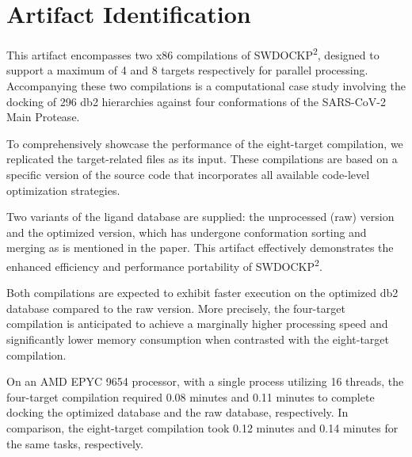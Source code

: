 \documentclass[nonacm,sigconf]{acmart}
\begin{document}
\section{Artifact Identification}


\newartifact

\artrel
This artifact encompasses two x86 compilations of SWDOCKP\textsuperscript{2}, designed to support a maximum of 4 and 8 targets respectively for parallel processing. Accompanying these two compilations is a computational case study involving the docking of 296 db2 hierarchies against four conformations of the SARS-CoV-2 Main Protease.

To comprehensively showcase the performance of the eight-target compilation, we replicated the target-related files as its input. These compilations are based on a specific version of the source code that incorporates all available code-level optimization strategies.

Two variants of the ligand database are supplied: the unprocessed (raw) version and the optimized version, which has undergone conformation sorting and merging as is mentioned in the paper. This artifact effectively demonstrates the enhanced efficiency and performance portability of SWDOCKP\textsuperscript{2}.


\artexp
Both compilations are expected to exhibit faster execution on the optimized db2 database compared to the raw version. More precisely, the four-target compilation is anticipated to achieve a marginally higher processing speed and significantly lower memory consumption when contrasted with the eight-target compilation.



\arttime
On an AMD EPYC 9654 processor, with a single process utilizing 16 threads, the four-target compilation required 0.08 minutes and 0.11 minutes to complete docking the optimized database and the raw database, respectively. In comparison, the eight-target compilation took 0.12 minutes and 0.14 minutes for the same tasks, respectively.
\end{document}
